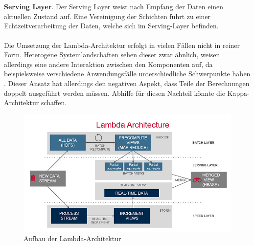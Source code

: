 \\ \\ \textbf{Serving Layer}. Der Serving Layer weist nach Empfang der Daten einen aktuellen Zustand auf. Eine Vereinigung der Schichten führt zu einer Echtzeitverarbeitung der Daten, welche sich im Serving-Layer befinden.\\ \\ 
Die Umsetzung der Lambda-Architektur erfolgt in vielen Fällen nicht in reiner Form. Heterogene Systemlandschaften sehen dieser zwar ähnlich, weisen allerdings eine andere Interaktion zwischen den Komponenten auf, da beispielsweise verschiedene Anwendungsfälle unterschiedliche Schwerpunkte haben \cite{Berle.2017}. Dieser Ansatz hat allerdings den negativen Aspekt, dass Teile der Berechnungen doppelt ausgeführt werden müssen. Abhilfe für diesen Nachteil könnte die Kappa-Architektur schaffen.
\begin{figure}[h!]
	\centering
	\includegraphics[width=1.0\linewidth]{images/lambda-architecture}
	\caption{Aufbau der Lambda-Architektur} %
	\label{fig:cnn_structure}
\end{figure}